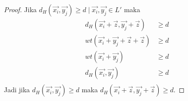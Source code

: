 \documentclass[conference,compsoc]{IEEEtran}
\begin{document}
\begin{proof}
Jika $d_H(\vec{x_i},\vec{y_j}) \ge d \mid \vec{x_i},\vec{y_j} \in L'$ maka
\begin{align*}
d_H(\vec{x_i}+\vec{z},\vec{y_j}+\vec{z}) &\ge d \\
wt(\vec{x_i}+\vec{y_j}+\vec{z}+\vec{z}) &\ge d \\
wt(\vec{x_i}+\vec{y_j}) &\ge d \\
d_H(\vec{x_i},\vec{y_j}) &\ge d \\
\end{align*}
Jadi jika $d_H(\vec{x_i},\vec{y_j}) \ge d$ maka $d_H(\vec{x_i}+\vec{z},\vec{y_j}+\vec{z}) \ge d$.
\end{proof}



\end{document}
